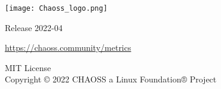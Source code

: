 \begin{titlepage}
    \begin{center}
        \vspace*{1.5cm}
            
        \texttt{[image: Chaoss\_logo.png]}
        
	\vspace{2cm}


        \vspace{1cm}
        \Huge
        Release 2022-04
            
        \vspace{1.5cm}
        
	\LARGE
	    \url{https://chaoss.community/metrics}
            
        \vfill
            
        \Large
        MIT License\\
        Copyright © 2022 CHAOSS a Linux Foundation® Project\\
            
    \end{center}
\end{titlepage}

\thispagestyle{empty}
